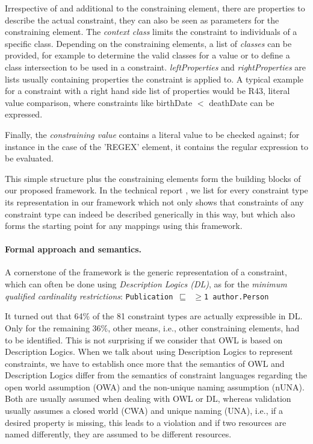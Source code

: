 \documentclass[a4paper,fontsize=11pt]{scrartcl}
\newcommand{\ms}[1]{\texttt{#1}}
\begin{document}
Irrespective of and additional to the constraining element, there are properties to describe the actual constraint, they can also be seen as parameters for the constraining element. The \emph{context class} limits the constraint to individuals of a specific class. Depending on the constraining elements, a list of \emph{classes} can be provided, for example to determine the valid classes for a value or to define a class intersection to be used in a constraint. \emph{leftProperties} and \emph{rightProperties} are lists usually containing properties the constraint is applied to. A typical example for a constraint with a right hand side list of properties would be R43, literal value comparison, where constraints like birthDate $<$ deathDate can be expressed.

Finally, the \emph{constraining value} contains a literal value to be checked against; for instance in the case of the 'REGEX' element, it contains the regular expression to be evaluated.

This simple structure plus the constraining elements form the building blocks of our proposed framework. In the technical report \cite{BoschNolleAcarEckert2015}, we list for every constraint type its representation in our framework which not only shows that constraints of any constraint type can indeed be described generically in this way, but which also forms the starting point for any mappings using this framework.

\paragraph{Formal approach and semantics.}

A cornerstone of the framework is the generic representation of a constraint, which can often be done using \emph{Description Logics (DL)}, as for the \emph{minimum qualified cardinality restrictions}: {\small\ms{Publication $\sqsubseteq$ $\geq$1 author.Person}}

It turned out that 64\% of the 81 constraint types are actually expressible in DL. Only for the remaining 36\%, other means, i.e., other constraining elements, had to be identified. This is not surprising if we consider that OWL is based on Description Logics. When we talk about using Description Logics to represent constraints, we have to establish once more that the semantics of OWL and Description Logics differ from the semantics of constraint languages regarding the open world assumption (OWA) and the non-unique naming assumption (nUNA). Both are usually assumed when dealing with OWL or DL, whereas validation usually assumes a closed world (CWA) and unique naming (UNA), i.e., if a desired property is missing, this leads to a violation and if two resources are named differently, they are assumed to be different resources. 
\end{document}
